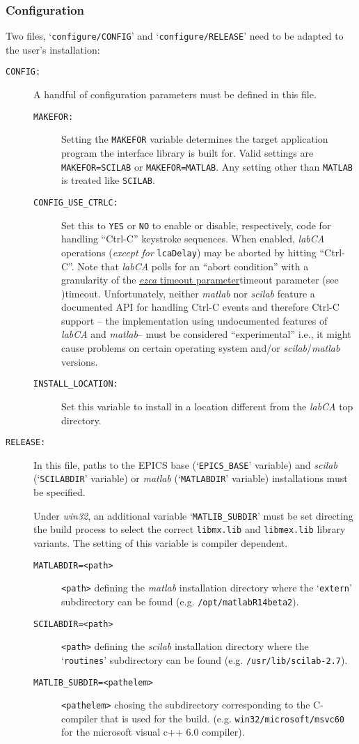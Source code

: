 \documentclass{article}
\newcommand{\sca}{\ita{labCA}}
\newcommand{\scilab}{\ita{scilab}}
\newcommand{\matlab}{\ita{matlab}}
\newcommand{\windoze}{\ita{win32}}
\newcommand{\ezca}{\ita{ezca}}
\newcommand{\com}[1]{{\tt #1}}
\newcommand{\ita}[1]{\emph{#1}}
\begin{document}
\subsubsection{Configuration}
Two files, `\com{configure/CONFIG}' and `\com{configure/RELEASE}' need to
be adapted to the user's installation:
\begin{description}
\item[\tt CONFIG:] A handful of configuration parameters must be defined
in this file.
\begin{description}
\item[\tt MAKEFOR:] Setting the \com{MAKEFOR} variable
determines the target application program the interface library is
built for. Valid settings are \com{MAKEFOR=SCILAB} or \com{MAKEFOR=MATLAB}.
Any setting other than \com{MATLAB} is treated like \com{SCILAB}.

\item[\tt CONFIG\_USE\_CTRLC:] Set this to {\tt YES} or {\tt NO} to enable
or disable, respectively, code for handling ``Ctrl-C'' keystroke sequences.
When enabled, \sca{} operations ({\em except for} \com{lcaDelay}) may be aborted
by hitting ``Ctrl-C''.
Note that \sca{} polls for an ``abort condition'' with a granularity of the
\hyperref[ref]{\ezca{} timeout parameter}{timeout parameter (see }{ )}{timeout}.
Unfortunately, neither \matlab{} nor \scilab{} feature a documented API for handling
Ctrl-C events and therefore Ctrl-C support -- the implementation using undocumented
features of \sca{} and \matlab -- must be considered ``experimental''
i.e., it might cause problems on certain operating system and/or \scilab/\matlab{}
versions.

\item[\tt INSTALL\_LOCATION:] Set this variable to install in a location
different from the \sca{} top directory.
\end{description}
%
%
\item[\tt RELEASE:] In this file, paths to the EPICS base (`\com{EPICS\_BASE}'
variable) and \scilab{} (`\com{SCILABDIR}' variable) or \matlab{} (`\com{MATLABDIR}'
variable) installations must be specified.

Under \windoze{}, an additional variable
`\com{MATLIB\_SUBDIR}' must be set directing the build process to select the correct
\com{libmx.lib} and \com{libmex.lib} library variants. The setting of this variable
is compiler dependent.
\begin{description}
\item[\tt MATLABDIR=<path>] \com{<path>} defining the \matlab{} installation
directory where the `\com{extern}' subdirectory can be found (e.g.
\com{/opt/matlabR14beta2}).
\item[\tt SCILABDIR=<path>] \com{<path>} defining the \scilab{} installation
directory where the `\com{routines}' subdirectory can be found (e.g.
\com{/usr/lib/scilab-2.7}).
\item[\tt MATLIB\_SUBDIR=<pathelem>] \com{<pathelem>} chosing the subdirectory
corresponding to the C-compiler that is used for the build. (e.g. 
\com{win32/microsoft/msvc60} for the microsoft visual c++ 6.0 compiler).
\end{description}
\end{description}
\end{document}
